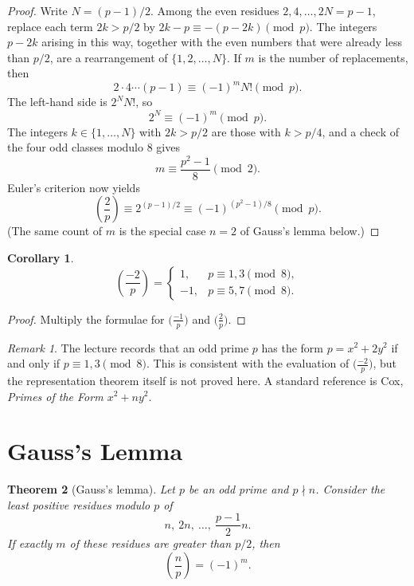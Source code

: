 \documentclass[11pt]{article}
\newtheorem{theorem}{Theorem}[section]
\newtheorem{corollary}[theorem]{Corollary}
\theoremstyle{remark}
\newtheorem*{remark}{Remark}
\begin{document}
\begin{proof}
Write $N=(p-1)/2$. Among the even residues $2,4,\ldots,2N=p-1$, replace each
term $2k>p/2$ by $2k-p\equiv -(p-2k)\pmod p$. The integers $p-2k$ arising
in this way, together with the even numbers that were already less than
$p/2$, are a rearrangement of $\{1,2,\ldots,N\}$. If $m$ is the number of
replacements, then
\[
    2\cdot 4\cdots(p-1)
    \equiv
    (-1)^m N!
    \pmod p.
\]
The left-hand side is $2^N N!$, so
\[
    2^N\equiv(-1)^m\pmod p.
\]
The integers $k\in\{1,\ldots,N\}$ with $2k>p/2$ are those with $k>p/4$, and
a check of the four odd classes modulo $8$ gives
\[
    m\equiv\frac{p^2-1}{8}\pmod 2.
\]
Euler's criterion now yields
\[
    \left(\frac 2p\right)
    \equiv
    2^{(p-1)/2}
    \equiv
    (-1)^{(p^2-1)/8}
    \pmod p.
\]
(The same count of $m$ is the special case $n=2$ of Gauss's lemma below.)
\end{proof}

\begin{corollary}
\[
\left(\frac{-2}{p}\right)
=
\begin{cases}
1,& p\equiv 1,3\pmod 8,\\[1mm]
-1,& p\equiv 5,7\pmod 8.
\end{cases}
\]
\end{corollary}

\begin{proof}
Multiply the formulae for $\bigl(\frac{-1}{p}\bigr)$ and $\bigl(\frac 2p\bigr)$.
\end{proof}

\begin{remark}
The lecture records that an odd prime $p$ has the form $p=x^2+2y^2$ if and
only if $p\equiv 1,3\pmod 8$. This is consistent with the evaluation of
$\bigl(\frac{-2}{p}\bigr)$, but the representation theorem itself is not
proved here. A standard reference is Cox, \emph{Primes of the Form
$x^2+ny^2$}.
\end{remark}

\section{Gauss's Lemma}

\begin{theorem}[Gauss's lemma]
Let $p$ be an odd prime and $p\nmid n$. Consider the least positive residues
modulo $p$ of
\[
    n,\ 2n,\ \ldots,\ \frac{p-1}{2}n.
\]
If exactly $m$ of these residues are greater than $p/2$, then
\[
    \boxed{\left(\frac np\right)=(-1)^m.}
\]
\end{theorem}
\end{document}
